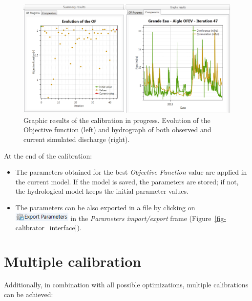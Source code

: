 \documentclass[
  letterpaper,
  DIV=11,
  numbers=noendperiod]{scrreprt}
\begin{document}
\begin{figure}

{\centering \includegraphics{./figures/fig-calibrator_graphic_results.png}

}

\caption{\label{fig-calibrator_graphic_results}Graphic results of the
calibration in progress. Evolution of the Objective function (left) and
hydrograph of both observed and current simulated discharge (right).}

\end{figure}

At the end of the calibration:

\begin{itemize}
\item
  The parameters obtained for the best \emph{Objective Function} value
  are applied in the current model. If the model is saved, the
  parameters are stored; if not, the hydrological model keeps the
  initial parameter values.
\item
  The parameters can be also exported in a file by clicking on
  \includegraphics[width=\textwidth,height=0.18in]{./figures/fig-icon_calibrator_export_param.png}
  in the \emph{Parameters import/export} frame
  (Figure~\ref{fig-calibrator_interface}).
\end{itemize}

\hypertarget{multiple-calibration}{%
\section{Multiple calibration}\label{multiple-calibration}}

Additionally, in combination with all possible optimizations, multiple
calibrations can be achieved:
\end{document}
